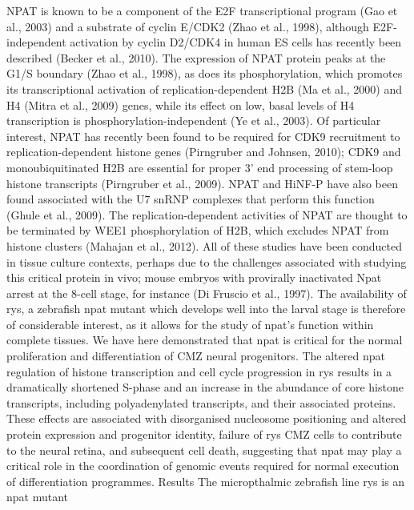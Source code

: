 NPAT is known to be a component of the E2F transcriptional program (Gao et al., 2003) and a substrate of cyclin E/CDK2 (Zhao et al., 1998), although E2F-independent activation by cyclin D2/CDK4 in human ES cells has recently been described (Becker et al., 2010). The expression of NPAT protein peaks at the G1/S boundary (Zhao et al., 1998), as does its phosphorylation, which promotes its transcriptional activation of replication-dependent H2B (Ma et al., 2000) and H4 (Mitra et al., 2009) genes, while its effect on low, basal levels of H4 transcription is phosphorylation-independent (Ye et al., 2003). Of particular interest, NPAT has recently been found to be required for CDK9 recruitment to replication-dependent histone genes (Pirngruber and Johnsen, 2010); CDK9 and monoubiquitinated H2B are essential for proper 3’ end processing of stem-loop histone transcripts (Pirngruber et al., 2009). NPAT and HiNF-P have also been found associated with the U7 snRNP complexes that perform this function (Ghule et al., 2009). The replication-dependent activities of NPAT are thought to be terminated by WEE1 phosphorylation of H2B, which excludes NPAT from histone clusters (Mahajan et al., 2012).
All of these studies have been conducted in tissue culture contexts, perhaps due to the challenges associated with studying this critical protein in vivo; mouse embryos with provirally inactivated Npat arrest at the 8-cell stage, for instance (Di Fruscio et al., 1997). The availability of rys, a zebrafish npat mutant which develops well into the larval stage is therefore of considerable interest, as it allows for the study of npat’s function within complete tissues. We have here demonstrated that npat is critical for the normal proliferation and differentiation of CMZ neural progenitors. The altered npat regulation of histone transcription and cell cycle progression in rys results in a dramatically shortened S-phase and an increase in the abundance of core histone transcripts, including polyadenylated transcripts, and their associated proteins. These effects are associated with disorganised nucleosome positioning and altered protein expression and progenitor identity, failure of rys CMZ cells to contribute to the neural retina, and subsequent cell death, suggesting that npat may play a critical role in the coordination of genomic events required for normal execution of differentiation programmes.
Results
The micropthalmic zebrafish line rys is an npat mutant
